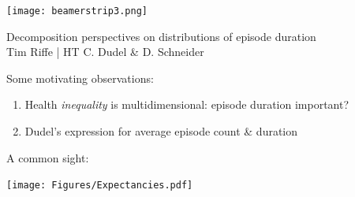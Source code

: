 \documentclass[20pt,usenames,dvipsnames]{beamer}
\begin{document}

\begin{frame}[plain]
	\vspace{-3cm}
 \centerline{\texttt{[image: beamerstrip3.png]}}

	\huge
	\vspace{1em}
	
	Decomposition perspectives on distributions of episode duration \\
	\vspace{1em}
	\large 
	Tim Riffe \pause | HT C. Dudel \& D. Schneider
\end{frame}

\begin{frame}[plain]
\Large
\centering
 Some motivating observations:\vspace{2em}
 \begin{enumerate}[<+->]
 \item Health \emph{inequality} is multidimensional: episode duration important? 
 \item Dudel's expression for average episode count \& duration
 \end{enumerate}
\end{frame}

\begin{frame}[plain]
\Large
A common sight:\vspace{-1em}
\begin{center}
\texttt{[image: Figures/Expectancies.pdf]}
\end{center}
\end{frame}
\end{document}
